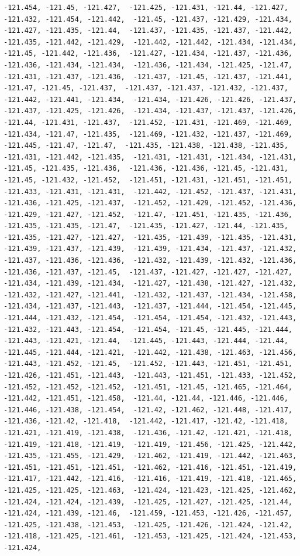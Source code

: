\documentclass[
]{article}
\begin{document}
\begin{verbatim}
-121.454, -121.45, -121.427,  -121.425, -121.431, -121.44, -121.427, -121.432, -121.454, -121.442,  -121.45, -121.437, -121.429, -121.434, -121.427, -121.435, -121.44,  -121.437, -121.435, -121.437, -121.442, -121.435, -121.442, -121.429,  -121.442, -121.442, -121.434, -121.434, -121.45, -121.442, -121.436,  -121.427, -121.434, -121.437, -121.436, -121.436, -121.434, -121.434,  -121.436, -121.434, -121.425, -121.47, -121.431, -121.437, -121.436,  -121.437, -121.45, -121.437, -121.441, -121.47, -121.45, -121.437,  -121.437, -121.437, -121.432, -121.437, -121.442, -121.441, -121.434,  -121.434, -121.426, -121.426, -121.437, -121.437, -121.425, -121.426,  -121.434, -121.437, -121.437, -121.426, -121.44, -121.431, -121.437,  -121.452, -121.431, -121.469, -121.469, -121.434, -121.47, -121.435,  -121.469, -121.432, -121.437, -121.469, -121.445, -121.47, -121.47,  -121.435, -121.438, -121.438, -121.435, -121.431, -121.442, -121.435,  -121.431, -121.431, -121.434, -121.431, -121.45, -121.435, -121.436,  -121.436, -121.436, -121.45, -121.431, -121.45, -121.432, -121.452,  -121.451, -121.431, -121.451, -121.451, -121.433, -121.431, -121.431,  -121.442, -121.452, -121.437, -121.431, -121.436, -121.425, -121.437,  -121.452, -121.429, -121.452, -121.436, -121.429, -121.427, -121.452,  -121.47, -121.451, -121.435, -121.436, -121.435, -121.435, -121.47,  -121.435, -121.427, -121.44, -121.435, -121.435, -121.427, -121.427,  -121.435, -121.439, -121.435, -121.431, -121.439, -121.437, -121.439,  -121.439, -121.434, -121.437, -121.432, -121.437, -121.436, -121.436,  -121.432, -121.439, -121.432, -121.436, -121.436, -121.437, -121.45,  -121.437, -121.427, -121.427, -121.427, -121.434, -121.439, -121.434,  -121.427, -121.438, -121.427, -121.432, -121.432, -121.427, -121.441,  -121.432, -121.437, -121.434, -121.458, -121.434, -121.437, -121.443,  -121.437, -121.444, -121.454, -121.445, -121.444, -121.432, -121.454,  -121.454, -121.454, -121.432, -121.443, -121.432, -121.443, -121.454,  -121.454, -121.45, -121.445, -121.444, -121.443, -121.421, -121.44,  -121.445, -121.443, -121.444, -121.44, -121.445, -121.444, -121.421,  -121.442, -121.438, -121.463, -121.456, -121.443, -121.452, -121.45,  -121.452, -121.443, -121.451, -121.451, -121.426, -121.451, -121.443,  -121.443, -121.451, -121.433, -121.452, -121.452, -121.452, -121.452,  -121.451, -121.45, -121.465, -121.464, -121.442, -121.451, -121.458,  -121.44, -121.44, -121.446, -121.446, -121.446, -121.438, -121.454,  -121.42, -121.462, -121.448, -121.417, -121.436, -121.42, -121.418,  -121.442, -121.417, -121.42, -121.418, -121.421, -121.419, -121.438,  -121.436, -121.42, -121.421, -121.418, -121.419, -121.418, -121.419,  -121.419, -121.456, -121.425, -121.442, -121.435, -121.455, -121.429,  -121.462, -121.419, -121.442, -121.463, -121.451, -121.451, -121.451,  -121.462, -121.416, -121.451, -121.419, -121.417, -121.442, -121.416,  -121.416, -121.419, -121.418, -121.465, -121.425, -121.425, -121.463,  -121.424, -121.423, -121.425, -121.462, -121.424, -121.424, -121.439,  -121.425, -121.427, -121.425, -121.44, -121.424, -121.439, -121.46,  -121.459, -121.453, -121.426, -121.457, -121.425, -121.438, -121.453,  -121.425, -121.426, -121.424, -121.42, -121.418, -121.425, -121.461,  -121.453, -121.425, -121.424, -121.453, -121.424, 
\end{verbatim}
\end{document}
